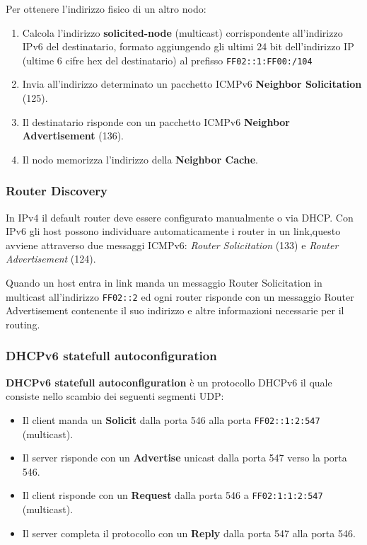             Per ottenere l'indirizzo fisico di un altro nodo:
            \begin{enumerate}
                \item Calcola l'indirizzo \textbf{solicited-node} (multicast) corrispondente all’indirizzo IPv6 del destinatario, formato aggiungendo gli ultimi 24 bit dell'indirizzo IP (ultime 6 cifre hex del destinatario) al prefisso \verb-FF02::1:FF00:/104-
                \item Invia all'indirizzo determinato un pacchetto ICMPv6 \textbf{Neighbor Solicitation} (125).
                \item Il destinatario risponde con un pacchetto ICMPv6 \textbf{Neighbor Advertisement} (136).
                \item Il nodo memorizza l'indirizzo della \textbf{Neighbor Cache}.
            \end{enumerate}

        \subsubsection{Router Discovery}
            In IPv4 il default router deve essere configurato manualmente o via DHCP. Con IPv6 gli host possono individuare automaticamente i router in un link,questo avviene attraverso due messaggi ICMPv6: \textit{Router Solicitation} (133) e \textit{Router Advertisement} (124).
        
            Quando un host entra in link manda un messaggio Router Solicitation in multicast all'indirizzo \verb-FF02::2- ed ogni router risponde con un messaggio Router Advertisement contenente il suo indirizzo e altre informazioni necessarie per il routing.

        \subsubsection{DHCPv6 statefull autoconfiguration}
            \textbf{DHCPv6 statefull autoconfiguration} è un protocollo DHCPv6 il quale consiste nello scambio dei seguenti segmenti UDP:
            \begin{itemize}
                \item Il client manda un \textbf{Solicit} dalla porta 546 alla porta \verb-FF02::1:2:547- (multicast).
                \item Il server risponde con un \textbf{Advertise} unicast dalla porta 547 verso la porta 546.
                \item Il client risponde con un \textbf{Request} dalla porta 546 a \verb-FF02:1:1:2:547- (multicast).
                \item Il server completa il protocollo con un \textbf{Reply} dalla porta 547 alla porta 546.
            \end{itemize}
        
